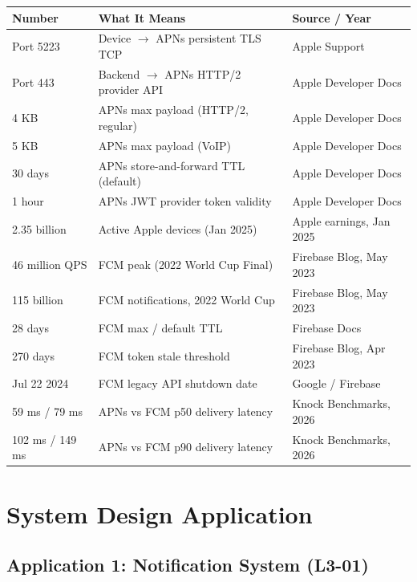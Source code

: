 \documentclass[11pt,a4paper]{article}
\begin{document}
\begin{center}
\renewcommand{\arraystretch}{1.4}
\begin{tabular}{p{4.5cm}p{5.5cm}p{4cm}}
\toprule
\textbf{Number} & \textbf{What It Means} & \textbf{Source / Year} \\
\midrule
Port 5223 & Device $\to$ APNs persistent TLS TCP & Apple Support \\
Port 443 & Backend $\to$ APNs HTTP/2 provider API & Apple Developer Docs \\
4 KB & APNs max payload (HTTP/2, regular) & Apple Developer Docs \\
5 KB & APNs max payload (VoIP) & Apple Developer Docs \\
30 days & APNs store-and-forward TTL (default) & Apple Developer Docs \\
1 hour & APNs JWT provider token validity & Apple Developer Docs \\
2.35 billion & Active Apple devices (Jan 2025) & Apple earnings, Jan 2025 \\
46 million QPS & FCM peak (2022 World Cup Final) & Firebase Blog, May 2023 \\
115 billion & FCM notifications, 2022 World Cup & Firebase Blog, May 2023 \\
28 days & FCM max / default TTL & Firebase Docs \\
270 days & FCM token stale threshold & Firebase Blog, Apr 2023 \\
Jul 22 2024 & FCM legacy API shutdown date & Google / Firebase \\
59 ms / 79 ms & APNs vs FCM p50 delivery latency & Knock Benchmarks, 2026 \\
102 ms / 149 ms & APNs vs FCM p90 delivery latency & Knock Benchmarks, 2026 \\
\bottomrule
\end{tabular}
\end{center}

\section{System Design Application}

\subsection{Application 1: Notification System (L3-01)}
\end{document}
